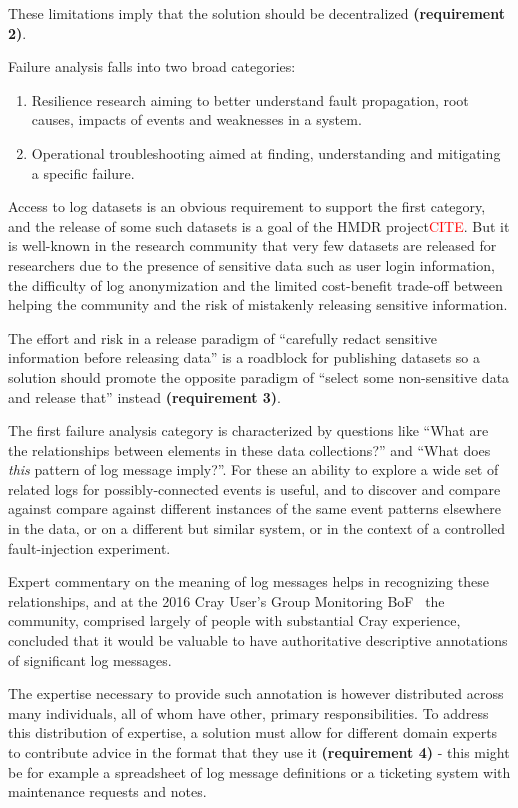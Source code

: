 These limitations imply that the solution should be decentralized 
\textbf{(requirement 2)}. 

Failure analysis falls into two broad categories:
\begin{enumerate}
\item Resilience research aiming to better understand fault propagation,
      root causes, impacts of events and weaknesses in a system. 
\item Operational troubleshooting aimed at finding, understanding and
      mitigating a specific failure.
\end{enumerate}

Access to log datasets is an obvious requirement to support
the first category, and the release of some such datasets is a goal 
of the HMDR project\textcolor{red}{CITE}. But it is well-known in the research 
community that very few datasets are released for researchers
due to the presence of sensitive data such as user login information, 
the difficulty of log anonymization and the limited cost-benefit 
trade-off between helping the community and the risk of mistakenly 
releasing sensitive information. 

The effort and risk in a release paradigm of ``carefully redact 
sensitive information before releasing data'' is a roadblock for 
publishing datasets so a solution should promote the opposite 
paradigm of ``select some non-sensitive data and release that'' 
instead \textbf{(requirement 3)}.

The first failure analysis category is characterized by questions 
like ``What are the relationships between elements in these data 
collections?'' and ``What does \emph{this} pattern of log message imply?''.
For these an ability to explore a wide set of related logs for 
possibly-connected events is useful, and to discover and compare 
against compare against different instances of the same event 
patterns elsewhere in the data, or on a different but similar 
system, or in the context of a controlled fault-injection experiment. 

Expert commentary on the meaning of log messages helps in recognizing
these relationships, and at the 2016 Cray User's Group Monitoring 
BoF~\cite{CUG2016BoF} the community, comprised largely of people with 
substantial Cray experience, concluded that it would be valuable to 
have authoritative descriptive annotations of significant log messages.

The expertise necessary to provide such annotation is however distributed 
across many individuals, all of whom have other, primary responsibilities. 
To address this distribution of expertise, a solution must allow for 
different domain experts to contribute advice in the format that they
use it \textbf{(requirement 4)} - this might be for example a 
spreadsheet of log message definitions or a ticketing system with 
maintenance requests and notes.


